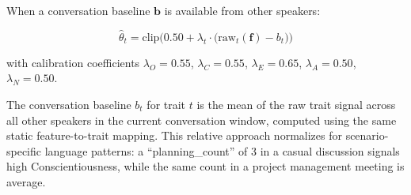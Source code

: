When a conversation baseline $\mathbf{b}$ is available from other speakers:

\begin{equation}
    \hat{\theta}_t = \text{clip}\Big(0.50 + \lambda_t \cdot \big(\text{raw}_t(\mathbf{f}) - b_t\big)\Big)
    \label{eq:dynamic}
\end{equation}

\noindent with calibration coefficients $\lambda_O = 0.55$, $\lambda_C = 0.55$, $\lambda_E = 0.65$, $\lambda_A = 0.50$, $\lambda_N = 0.50$.

The conversation baseline $b_t$ for trait $t$ is the mean of the raw trait signal across all other speakers in the current conversation window, computed using the same static feature-to-trait mapping. This relative approach normalizes for scenario-specific language patterns: a ``planning\_count'' of 3 in a casual discussion signals high Conscientiousness, while the same count in a project management meeting is average.
